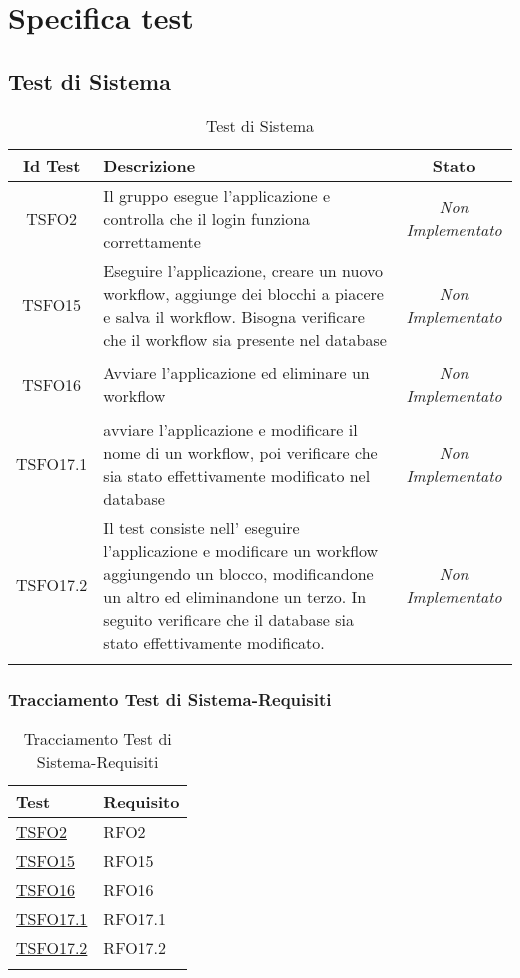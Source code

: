 \chapter{Specifica test}
\label{test}
\section{Test di Sistema}
\normalsize
\begin{longtable}{|c|>{}m{8cm}|c|}
\hline 
\textbf{Id Test} & \textbf{Descrizione} & \textbf{Stato}\\
\hline
\endhead
\hypertarget{TSFO2}{TSFO2} & Il gruppo esegue l'applicazione e controlla che il login funziona correttamente & \textit{Non Implementato}\\ \hline
\hypertarget{TSFO15}{TSFO15} & Eseguire l'applicazione, creare un nuovo workflow, aggiunge dei blocchi a piacere e salva il workflow. Bisogna verificare che il workflow sia presente nel database & \textit{Non Implementato}\\ \hline
\hypertarget{TSFO16}{TSFO16} & Avviare l'applicazione ed eliminare un workflow & \textit{Non Implementato}\\ \hline
\hypertarget{TSFO17.1}{TSFO17.1} & avviare l'applicazione e modificare il nome di un workflow, poi verificare che sia stato effettivamente modificato nel database & \textit{Non Implementato}\\ \hline
\hypertarget{TSFO17.2}{TSFO17.2} & Il test consiste nell' eseguire l'applicazione e modificare un workflow aggiungendo un blocco, modificandone un altro ed eliminandone un terzo. In seguito verificare che il database sia stato effettivamente modificato. & \textit{Non Implementato}\\ \hline
\caption[Test di Sistema]{Test di Sistema}
\label{tabella:test1}
\end{longtable}
\clearpage
\subsection{Tracciamento Test di Sistema-Requisiti}
\normalsize
\begin{longtable}{|>{\centering}m{5cm}|m{5cm}<{\centering}|}
\hline
\textbf{Test} & \textbf{Requisito}\\
\hline
\endhead
\hyperlink{TSFO2}{TSFO2} & RFO2\\ \hline
\hyperlink{TSFO15}{TSFO15} & RFO15\\ \hline
\hyperlink{TSFO16}{TSFO16} & RFO16\\ \hline
\hyperlink{TSFO17.1}{TSFO17.1} & RFO17.1\\ \hline
\hyperlink{TSFO17.2}{TSFO17.2} & RFO17.2\\ \hline
\caption[Tracciamento Test di Sistema-Requisiti]{Tracciamento Test di Sistema-Requisiti}
\label{tabella:ts-requi}
\end{longtable}
\clearpage


